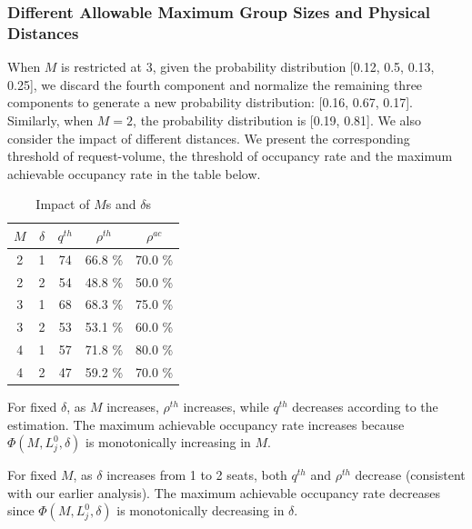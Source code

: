 

\subsubsection{Different Allowable Maximum Group Sizes and Physical Distances}
When $M$ is restricted at 3, given the probability distribution [0.12, 0.5, 0.13, 0.25], we discard the fourth component and normalize the remaining three components to generate a new probability distribution: [0.16, 0.67, 0.17]. Similarly, when $M =2$, the probability distribution is [0.19, 0.81].
We also consider the impact of different distances. We present the corresponding threshold of request-volume, the threshold of occupancy rate and the maximum achievable occupancy rate in the table below.

\begin{table}[ht]
  \centering
  \caption{Impact of $M$s and $\delta$s}
  \begin{tabular}{ccccc}
  \hline
  \hline
   $M$  & $\delta$ & $q^{th}$ & $\rho^{th}$ & $\rho^{ac}$ \\
  \hline
   2 & 1 & 74  & 66.8 \% & 70.0 \% \\
   2 & 2 & 54  & 48.8 \% & 50.0 \% \\ 
   3 & 1 & 68  & 68.3 \% & 75.0 \% \\
   3 & 2 & 53  & 53.1 \% & 60.0 \% \\
   4 & 1 & 57  & 71.8 \% & 80.0 \% \\
   4 & 2 & 47  & 59.2 \% & 70.0 \% \\
   \hline
   \hline
  \end{tabular}
\end{table}

For fixed $\delta$, as $M$ increases, $\rho^{th}$ increases, while $q^{th}$ decreases according to the estimation. The maximum achievable occupancy rate increases because $\Phi(M, L_j^{0}, \delta)$ is monotonically increasing in $M$.

For fixed $M$, as $\delta$ increases from 1 to 2 seats, both $q^{th}$ and $\rho^{th}$ decrease (consistent with our earlier analysis). The maximum achievable occupancy rate decreases since $\Phi(M, L_j^{0}, \delta)$ is monotonically decreasing in $\delta$.

